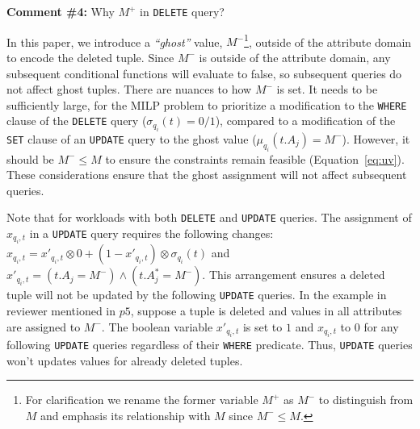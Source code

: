 \comskip

\noindent
\textbf{Comment \#4:} Why $M^+$ in \texttt{DELETE} query?
\begin{quote}
\end{quote}


In this paper, we introduce a \emph{``ghost''} value, 
$M^-$\footnote{For clarification we rename the former variable $M^+$ as $M^-$ to distinguish
from $M$ and emphasis its relationship with $M$ since $M^- \leq M$.}, outside of the attribute domain
to encode the deleted tuple.
Since $M^-$ is outside of the attribute domain, any subsequent conditional functions will
evaluate to false, so subsequent queries do not affect ghost tuples. There are
nuances to how $M^-$ is set. It needs to be sufficiently large, for the MILP
problem to prioritize a modification to the \texttt{WHERE} clause of the
\texttt{DELETE} query ($\sigma_{q_i}(t) = 0/1$), compared to a modification of
the \texttt{SET} clause of an \texttt{UPDATE} query to the ghost value
($\mu_{q_i}(t.A_j) = M^-$). However, it should be $M^- \leq M $ to ensure the
constraints remain feasible (Equation~\ref{eq:uv}). These considerations
ensure that the ghost assignment will not affect subsequent queries.

Note that for workloads with both \texttt{DELETE} and \texttt{UPDATE} queries.
The assignment of $x_{q_i, t}$ in a \texttt{UPDATE} query 
requires the following changes:
$x_{q_i, t} = x'_{q_i, t} \otimes 0 + (1-x'_{q_i, t}) \otimes \sigma_{q_i}(t)$ and
$x'_{q_i, t}= (t.A_j = M^-) \wedge (t.A_j^* = M^-)$.
This arrangement ensures a deleted tuple will not be updated by the following \texttt{UPDATE} queries. 
In the example in reviewer mentioned in $p5$, suppose a tuple is deleted and values in all attributes are assigned to $M^-$. 
The boolean variable $x'_{q_i, t}$ is set to $1$ and $x_{q_i, t} $ to $0$ for any following \texttt{UPDATE} queries regardless
of their \texttt{WHERE} predicate. Thus, \texttt{UPDATE} queries won't updates values for already deleted tuples. 

